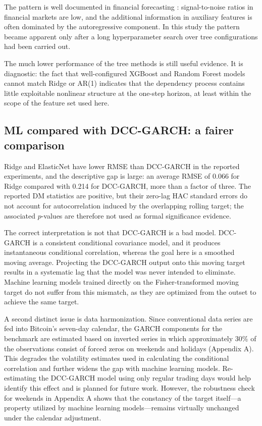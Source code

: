 The pattern is well documented in financial forecasting \cite{welch2008}: signal-to-noise ratios in financial markets are low, and the additional information in auxiliary features is often dominated by the autoregressive component. In this study the pattern became apparent only after a long hyperparameter search over tree configurations had been carried out.

The much lower performance of the tree methods is still useful evidence. It is diagnostic: the fact that well-configured XGBoost and Random Forest models cannot match Ridge or AR(1) indicates that the dependency process contains little exploitable nonlinear structure at the one-step horizon, at least within the scope of the feature set used here.

\subsection{ML compared with DCC-GARCH: a fairer comparison}

Ridge and ElasticNet have lower RMSE than DCC-GARCH in the reported experiments, and the descriptive gap is large: an average RMSE of 0.066 for Ridge compared with 0.214 for DCC-GARCH, more than a factor of three. The reported DM statistics are positive, but their zero-lag HAC standard errors do not account for autocorrelation induced by the overlapping rolling target; the associated $p$-values are therefore not used as formal significance evidence.

The correct interpretation is not that DCC-GARCH is a bad model. DCC-GARCH is a consistent conditional covariance model, and it produces instantaneous conditional correlation, whereas the goal here is a smoothed moving average. Projecting the DCC-GARCH output onto this moving target results in a systematic lag that the model was never intended to eliminate. Machine learning models trained directly on the Fisher-transformed moving target do not suffer from this mismatch, as they are optimized from the outset to achieve the same target.

A second distinct issue is data harmonization. Since conventional data series are fed into Bitcoin's seven-day calendar, the GARCH components for the benchmark are estimated based on inverted series in which approximately 30\% of the observations consist of forced zeros on weekends and holidays (Appendix A). This degrades the volatility estimates used in calculating the conditional correlation and further widens the gap with machine learning models. Re-estimating the DCC-GARCH model using only regular trading days would help identify this effect and is planned for future work. However, the robustness check for weekends in Appendix A shows that the constancy of the target itself—a property utilized by machine learning models—remains virtually unchanged under the calendar adjustment.

